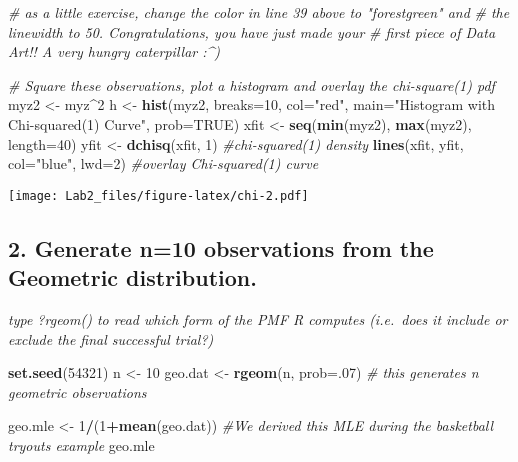 \documentclass[
]{article}
\newenvironment{Shaded}{\begin{snugshade}}{\end{snugshade}}
\newcommand{\AttributeTok}[1]{\textcolor[rgb]{0.13,0.29,0.53}{#1}}
\newcommand{\CommentTok}[1]{\textcolor[rgb]{0.56,0.35,0.01}{\textit{#1}}}
\newcommand{\ConstantTok}[1]{\textcolor[rgb]{0.56,0.35,0.01}{#1}}
\newcommand{\DecValTok}[1]{\textcolor[rgb]{0.00,0.00,0.81}{#1}}
\newcommand{\FunctionTok}[1]{\textcolor[rgb]{0.13,0.29,0.53}{\textbf{#1}}}
\newcommand{\NormalTok}[1]{#1}
\newcommand{\OtherTok}[1]{\textcolor[rgb]{0.56,0.35,0.01}{#1}}
\newcommand{\SpecialCharTok}[1]{\textcolor[rgb]{0.81,0.36,0.00}{\textbf{#1}}}
\newcommand{\StringTok}[1]{\textcolor[rgb]{0.31,0.60,0.02}{#1}}
\begin{document}
\begin{Shaded}
\begin{Highlighting}[]
\CommentTok{\# as a little exercise, change the color in line 39 above to "forestgreen" and}
\CommentTok{\# the linewidth to 50. Congratulations, you have just made your }
\CommentTok{\# first piece of Data Art!! A very hungry caterpillar :\^{})}

\CommentTok{\# Square these observations, plot a histogram and overlay the chi{-}square(1) pdf}
\NormalTok{myz2 }\OtherTok{\textless{}{-}}\NormalTok{ myz}\SpecialCharTok{\^{}}\DecValTok{2}
\NormalTok{h }\OtherTok{\textless{}{-}} \FunctionTok{hist}\NormalTok{(myz2, }\AttributeTok{breaks=}\DecValTok{10}\NormalTok{, }\AttributeTok{col=}\StringTok{"red"}\NormalTok{, }
    \AttributeTok{main=}\StringTok{"Histogram with Chi{-}squared(1) Curve"}\NormalTok{, }\AttributeTok{prob=}\ConstantTok{TRUE}\NormalTok{) }
\NormalTok{xfit }\OtherTok{\textless{}{-}} \FunctionTok{seq}\NormalTok{(}\FunctionTok{min}\NormalTok{(myz2), }\FunctionTok{max}\NormalTok{(myz2), }\AttributeTok{length=}\DecValTok{40}\NormalTok{) }
\NormalTok{yfit }\OtherTok{\textless{}{-}} \FunctionTok{dchisq}\NormalTok{(xfit, }\DecValTok{1}\NormalTok{)    }\CommentTok{\#chi{-}squared(1) density}
\FunctionTok{lines}\NormalTok{(xfit, yfit, }\AttributeTok{col=}\StringTok{"blue"}\NormalTok{, }\AttributeTok{lwd=}\DecValTok{2}\NormalTok{) }\CommentTok{\#overlay Chi{-}squared(1) curve}
\end{Highlighting}
\end{Shaded}

\texttt{[image: Lab2\_files/figure-latex/chi-2.pdf]}

\hypertarget{generate-n10-observations-from-the-geometric-distribution.}{%
\subsection{2. Generate n=10 observations from the Geometric
distribution.}\label{generate-n10-observations-from-the-geometric-distribution.}}

\emph{type ?rgeom() to read which form of the PMF R computes (i.e.~does
it include or exclude the final successful trial?)}

\begin{Shaded}
\begin{Highlighting}[]
\FunctionTok{set.seed}\NormalTok{(}\DecValTok{54321}\NormalTok{)}
\NormalTok{n }\OtherTok{\textless{}{-}} \DecValTok{10}
\NormalTok{geo.dat }\OtherTok{\textless{}{-}} \FunctionTok{rgeom}\NormalTok{(n, }\AttributeTok{prob=}\NormalTok{.}\DecValTok{07}\NormalTok{)   }\CommentTok{\# this generates n geometric observations}

\NormalTok{geo.mle }\OtherTok{\textless{}{-}} \DecValTok{1}\SpecialCharTok{/}\NormalTok{(}\DecValTok{1}\SpecialCharTok{+}\FunctionTok{mean}\NormalTok{(geo.dat)) }\CommentTok{\#We derived this MLE during the basketball tryouts example}
\NormalTok{geo.mle}
\end{Highlighting}
\end{Shaded}
\end{document}
